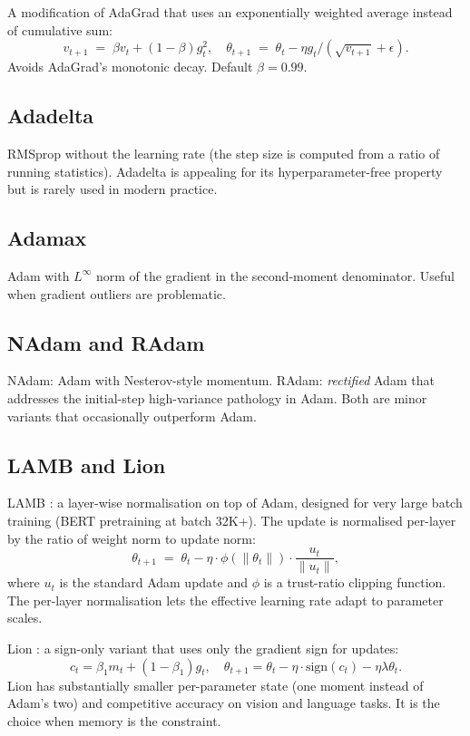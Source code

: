 A modification of AdaGrad that uses an exponentially weighted
average instead of cumulative sum:
\[
v_{t+1} \;=\; \beta v_t + (1 - \beta) g_t^2,
\quad
\theta_{t+1} \;=\; \theta_t - \eta g_t / (\sqrt{v_{t+1}} + \epsilon).
\]
Avoids AdaGrad's monotonic decay. Default $\beta = 0.99$.

\subsection{Adadelta}
\label{ssec:optimizers:adadelta}

RMSprop without the learning rate (the step size is computed
from a ratio of running statistics). Adadelta is appealing for
its hyperparameter-free property but is rarely used in modern
practice.

\subsection{Adamax}
\label{ssec:optimizers:adamax}

Adam with $L^\infty$ norm of the gradient in the second-moment
denominator. Useful when gradient outliers are problematic.

\subsection{NAdam and RAdam}
\label{ssec:optimizers:nadam_radam}

NAdam: Adam with Nesterov-style momentum. RAdam:
\emph{rectified} Adam that addresses the initial-step
high-variance pathology in Adam. Both are minor variants that
occasionally outperform Adam.

\subsection{LAMB and Lion}
\label{ssec:optimizers:lamb_lion}

LAMB \cite{liu_lamb_2020}: a layer-wise normalisation on top of
Adam, designed for very large batch training (BERT pretraining
at batch 32K+). The update is normalised per-layer by the ratio
of weight norm to update norm:
\[
  \theta_{t+1} \;=\; \theta_t - \eta \cdot \phi(\|\theta_t\|) \cdot \frac{u_t}{\|u_t\|},
\]
where $u_t$ is the standard Adam update and
$\phi$ is a trust-ratio clipping function. The per-layer
normalisation lets the effective learning rate adapt to
parameter scales.

Lion \cite{liu_lion_2023}: a sign-only variant that uses only
the gradient sign for updates:
\[
  c_t = \beta_1 m_t + (1 - \beta_1) g_t, \quad
  \theta_{t+1} = \theta_t - \eta \cdot \mathrm{sign}(c_t) - \eta \lambda \theta_t.
\]
Lion has substantially smaller per-parameter state (one moment
instead of Adam's two) and competitive accuracy on vision and
language tasks. It is the choice when memory is the constraint.

